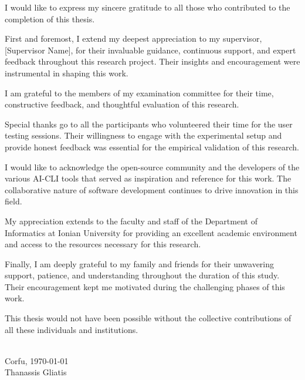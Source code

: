 I would like to express my sincere gratitude to all those who contributed to the completion of this thesis.

First and foremost, I extend my deepest appreciation to my supervisor, [Supervisor Name], for their invaluable guidance, continuous support, and expert feedback throughout this research project. Their insights and encouragement were instrumental in shaping this work.

I am grateful to the members of my examination committee for their time, constructive feedback, and thoughtful evaluation of this research.

Special thanks go to all the participants who volunteered their time for the user testing sessions. Their willingness to engage with the experimental setup and provide honest feedback was essential for the empirical validation of this research.

I would like to acknowledge the open-source community and the developers of the various AI-CLI tools that served as inspiration and reference for this work. The collaborative nature of software development continues to drive innovation in this field.

My appreciation extends to the faculty and staff of the Department of Informatics at Ionian University for providing an excellent academic environment and access to the resources necessary for this research.

Finally, I am deeply grateful to my family and friends for their unwavering support, patience, and understanding throughout the duration of this study. Their encouragement kept me motivated during the challenging phases of this work.

This thesis would not have been possible without the collective contributions of all these individuals and institutions.

\bigskip \\
Corfu, \today \\
Thanassis Gliatis


